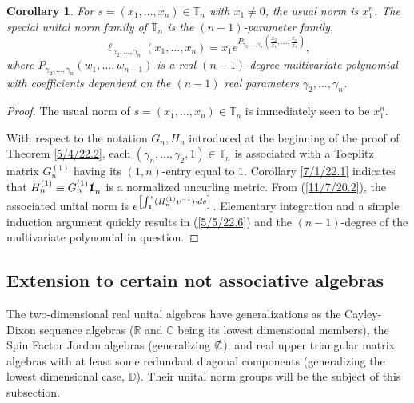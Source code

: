 \documentclass{amsart}
\numberwithin{equation}{section}
\newtheorem{corollary}[theorem]{Corollary}
\theoremstyle{definition}
\numberwithin{theorem}{section}
\begin{document}
\begin{corollary}\label{5/17/22.1} For $s= (x_1,\dots,x_n)\in \mathbb{T}_n$ with $x_1\ne 0$, the usual norm is $x_1^n$.  The special unital norm family of $\mathbb{T}_n$ is the $(n-1)$-parameter family,
\begin{equation} \label{5/5/22.6} \ell_{\gamma_2,\dots,\gamma_n}(x_1,\dots,x_n) = x_1 e^{P_{\gamma_2,\dots,\gamma_n}\left(\frac{x_2}{x_1},\dots,\frac{x_n}{x_1}\right)},\end{equation} where $P_{\gamma_2,\dots,\gamma_n}(w_1,\dots,w_{n-1})$ is a real $(n-1)$-degree multivariate polynomial with coefficients dependent on the $(n-1)$ real parameters $\gamma_2,\dots,\gamma_n$.    \end{corollary}

\begin{proof} The usual norm of $s=(x_1,\dots,x_n)\in \mathbb{T}_n$ is immediately seen to be $x_1^n$.

With respect to the notation $G_n,H_n$ introduced at the beginning of the proof of Theorem \ref{5/4/22.2}, each $(\gamma_n,\dots,\gamma_2,1)\in\mathbb{T}_n$ is associated with a Toeplitz matrix $G_n^{(1)}$ having its $(1,n)$-entry equal to $1$.  Corollary \ref{7/1/22.1} indicates that $H^{(1)}_n\equiv G_n^{(1)}\slashed{\bf 1}_n$ is a normalized uncurling metric. From (\ref{11/7/20.2}),  the associated unital norm is $e^{\left[\int_{\bf 1}^s (H_n^{(1)} v^{-1})\cdot dv\right]}$.  Elementary integration and a simple induction argument quickly results in (\ref{5/5/22.6}) and the $(n-1)$-degree of the multivariate polynomial in question.
\end{proof}
 
\subsection{Extension to certain not associative algebras}
The two-dimensional real unital algebras have generalizations as the Cayley-Dixon sequence algebras ($\mathbb{R}$ and $\mathbb{C}$ being its lowest dimensional members),  the Spin Factor Jordan algebras (generalizing $\slashed{\mathbb{C}}$), and real upper triangular matrix algebras with at least some redundant diagonal components (generalizing the lowest dimensional case, $\mathbb{D}$).  Their unital norm groups will be the subject of this subsection. 
\end{document}
